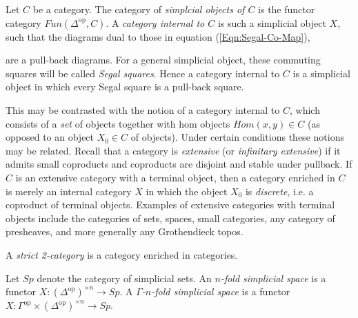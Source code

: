 \documentclass{amsart}
\begin{document}
Let $C$ be a category. The category of {\em simplcial objects of $C$} is the functor category $Fun(\Delta^\textrm{op}, C)$. A {\em category internal to $C$} is such a simplicial object $X$, such that the diagrams dual to those in equation (\ref{Eqn:Segal-Co-Map}),
\begin{center}
\end{center}
are a pull-back diagrams. For a general simplicial object, these commuting squares will be called {\em Segal squares}. Hence a category internal to $C$ is a simplicial object in which every Segal square is a pull-back square. 

This may be contrasted with the notion of a category internal to $C$, which consists of a {\em set} of objects together with hom objects $Hom(x,y) \in C$ (as opposed to an object $X_0 \in C$ of objects). Under certain conditions these notions may be related. Recall that a category is {\em extensive} (or {\em infinitary extensive}) if it admits small coproducts and coproducts are disjoint and stable under pullback. If $C$ is an extensive category with a terminal object, then a category enriched in $C$ is merely an internal category $X$ in which the object $X_0$ is {\em discrete}, i.e. a coproduct of terminal objects. Examples of extensive categories with terminal objects include the categories of sets, spaces, small categories, any category of presheaves, and more generally any Grothendieck topos. 

\begin{example}
	A {\em strict 2-category} is a category enriched in categories.
\end{example}

\begin{definition}
	Let $Sp$ denote the category of simplicial sets. An {\em $n$-fold simplicial space} is a functor $X: (\Delta^\textrm{op})^{\times n} \to Sp$. A {\em $\Gamma$-$n$-fold simplicial space} is a functor $X: \Gamma^\textrm{op} \times (\Delta^\textrm{op})^{\times n} \to Sp$.
\end{definition}
\end{document}

